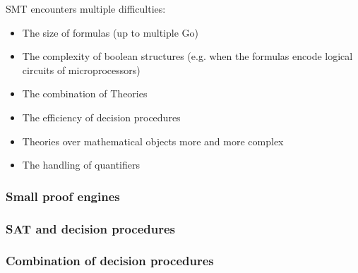 \documentclass[toc]{../cs-classes/cs-classes}
\begin{document}
SMT encounters multiple difficulties:
\begin{itemize}
    \item The size of formulas (up to multiple Go)
    \item The complexity of boolean structures (e.g. when the formulas encode logical circuits of microprocessors)
    \item The combination of Theories
    \item The efficiency of decision procedures
    \item Theories over mathematical objects more and more complex
    \item The handling of quantifiers
\end{itemize}

\subsubsection{Small proof engines}

\subsubsection{SAT and decision procedures}

\subsubsection{Combination of decision procedures}
\end{document}

